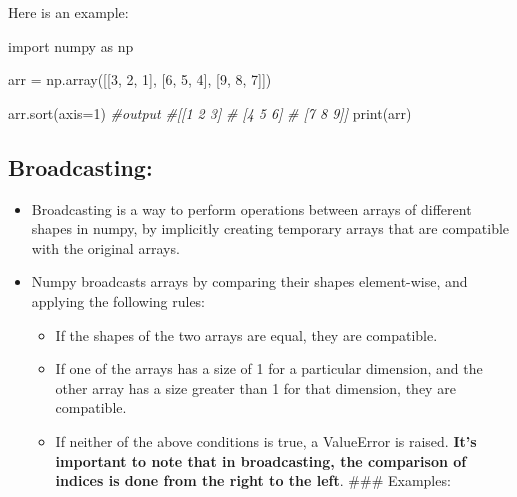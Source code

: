 \documentclass[11pt]{article}
\providecommand{\tightlist}{%
      \setlength{\itemsep}{0pt}\setlength{\parskip}{0pt}}
\newenvironment{Shaded}{}{}
\newcommand{\DecValTok}[1]{\textcolor[rgb]{0.25,0.63,0.44}{{#1}}}
\newcommand{\CommentTok}[1]{\textcolor[rgb]{0.38,0.63,0.69}{\textit{{#1}}}}
\newcommand{\NormalTok}[1]{{#1}}
\newcommand{\ImportTok}[1]{{#1}}
\newcommand{\OperatorTok}[1]{\textcolor[rgb]{0.40,0.40,0.40}{{#1}}}
\newcommand{\BuiltInTok}[1]{{#1}}
\begin{document}
Here is an example:

\begin{Shaded}
\begin{Highlighting}[]
\ImportTok{import}\NormalTok{ numpy }\ImportTok{as}\NormalTok{ np}

\NormalTok{arr }\OperatorTok{=}\NormalTok{ np.array([[}\DecValTok{3}\NormalTok{, }\DecValTok{2}\NormalTok{, }\DecValTok{1}\NormalTok{],}
\NormalTok{                [}\DecValTok{6}\NormalTok{, }\DecValTok{5}\NormalTok{, }\DecValTok{4}\NormalTok{],}
\NormalTok{                [}\DecValTok{9}\NormalTok{, }\DecValTok{8}\NormalTok{, }\DecValTok{7}\NormalTok{]])}

\NormalTok{arr.sort(axis}\OperatorTok{=}\DecValTok{1}\NormalTok{)}
\CommentTok{\#output}
\CommentTok{\#[[1 2 3]}
\CommentTok{\# [4 5 6]}
\CommentTok{\# [7 8 9]]}
\BuiltInTok{print}\NormalTok{(arr)}
\end{Highlighting}
\end{Shaded}


\hypertarget{broadcasting-1}{%
\subsection{Broadcasting:}\label{broadcasting-1}}

\begin{itemize}
\tightlist
\item
  Broadcasting is a way to perform operations between arrays of
  different shapes in numpy, by implicitly creating temporary arrays
  that are compatible with the original arrays.
\item
  Numpy broadcasts arrays by comparing their shapes element-wise, and
  applying the following rules:

  \begin{itemize}
  \tightlist
  \item
    If the shapes of the two arrays are equal, they are compatible.
  \item
    If one of the arrays has a size of 1 for a particular dimension, and
    the other array has a size greater than 1 for that dimension, they
    are compatible.
  \item
    If neither of the above conditions is true, a ValueError is raised.
    \textbf{It's important to note that in broadcasting, the comparison
    of indices is done from the right to the left}. \#\#\# Examples:
  \end{itemize}
\end{itemize}
\end{document}
